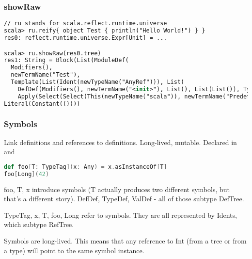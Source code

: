 \documentclass[hyperref={bookmarks=false}]{beamer}
\begin{document}
\begin{frame}[fragile]
\frametitle{showRaw}

\begin{lstlisting}[language=XML]
// ru stands for scala.reflect.runtime.universe
scala> ru.reify{ object Test { println("Hello World!") } }
res0: reflect.runtime.universe.Expr[Unit] = ...

scala> ru.showRaw(res0.tree)
res1: String = Block(List(ModuleDef(
  Modifiers(),
  newTermName("Test"),
  Template(List(Ident(newTypeName("AnyRef"))), List(
    DefDef(Modifiers(), newTermName("<init>"), List(), List(List()), TypeTree(), Block(List(Apply(Select(Super(This(newTypeName("")), newTypeName("")), newTermName("<init>")), List())), Literal(Constant(())))),
    Apply(Select(Select(This(newTypeName("scala")), newTermName("Predef")), newTermName("println")), List(Literal(Constant("Hello World!")))))))),
Literal(Constant(())))
\end{lstlisting}

\end{frame}

\begin{frame}[fragile]
\frametitle{Symbols}

Link definitions and references to definitions.
Long-lived, mutable.
Declared in  and 

\begin{lstlisting}[language=Scala]
def foo[T: TypeTag](x: Any) = x.asInstanceOf[T]
foo[Long](42)
\end{lstlisting}

foo, T, x introduce symbols (T actually produces two different symbols, but that's a different story).
DefDef, TypeDef, ValDef - all of those subtype DefTree.

TypeTag, x, T, foo, Long refer to symbols.
They are all represented by Idents, which subtype RefTree.

Symbols are long-lived. This means that any
reference to Int (from a tree or from a type) will point to the
same symbol instance.

\end{frame}
\end{document}
